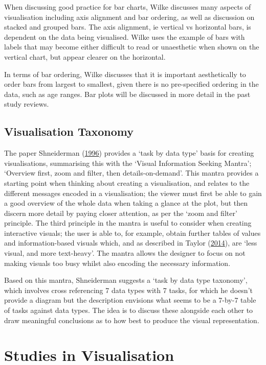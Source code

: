 \documentclass[
  11pt,
]{book}
\begin{document}
When discussing good practice for bar charts, Wilke discusses many
aspects of visualisation including axis alignment and bar ordering, as
well as discussion on stacked and grouped bars. The axis alignment, ie
vertical vs horizontal bars, is dependent on the data being visualised.
Wilke uses the example of bars with labels that may become either
difficult to read or unaesthetic when shown on the vertical chart, but
appear clearer on the horizontal.

In terms of bar ordering, Wilke discusses that it is important
aesthetically to order bars from largest to smallest, given there is no
pre-specified ordering in the data, such as age ranges. Bar plots will
be discussed in more detail in the past study reviews.

\subsection{Visualisation Taxonomy}

The paper Shneiderman (\protect\hyperlink{ref-taxonomy}{1996}) provides
a `task by data type' basis for creating visualisations, summarising
this with the `Visual Information Seeking Mantra'; `Overview first, zoom
and filter, then details-on-demand'. This mantra provides a starting
point when thinking about creating a visualisation, and relates to the
different messages encoded in a visualisation; the viewer must first be
able to gain a good overview of the whole data when taking a glance at
the plot, but then discern more detail by paying closer attention, as
per the `zoom and filter' principle. The third principle in the mantra
is useful to consider when creating interactive visuals; the user is
able to, for example, obtain further tables of values and
information-based visuals which, and as described in Taylor
(\protect\hyperlink{ref-taylor2014}{2014}), are `less visual, and more
text-heavy'. The mantra allows the designer to focus on not making
visuals too busy whilst also encoding the necessary information.

Based on this mantra, Shneiderman suggests a `task by data type
taxonomy', which involves cross referencing 7 data types with 7 tasks,
for which he doesn't provide a diagram but the description envisions
what seems to be a 7-by-7 table of tasks against data types. The idea is
to discuss these alongside each other to draw meaningful conclusions as
to how best to produce the visual representation.

\section{Studies in Visualisation}
\end{document}
